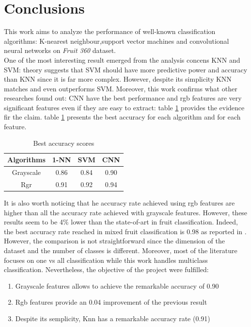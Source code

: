 \documentclass{article}
\begin{document}
\section{Conclusions}
This work aims to analyze the performance of well-known classification algorithms: K-nearest neighbour,support vector machines and convolutional neural networks on \textit{Fruit 360} dataset.\\
One of the most interesting result emerged from the analysis concens KNN and SVM: theory suggests that SVM should have more predictive power and accuracy than KNN since it is far more complex. However, despite its simplicity KNN matches and even outperforms SVM. Moreover, this work confirms what other researches found out: CNN have the best performance and rgb features are very significant features even if they are easy to extract: table \ref{results} provides the evidence fir the claim.
table \ref{results} presents the best accuracy for each algorithm and for each feature.
\begin{table}[H]
\centering
 \begin{tabular}{|c|c|c|c|} 
 \hline
  Algorithms & 1-NN & SVM & CNN\\
 \hline
 Grayscale&0.86&0.84&0.90 \\
 \hline
 Rgr&0.91& 0.92 & 0.94  \\
 \hline
\end{tabular}
\caption{Best accuracy scores} \label{results}
\end{table}
\noindent It is also worth noticing that he accuracy rate achieved using rgb features are higher than all the accuracy rate achieved with grayscale features. However, these results seem to be 4\% lower than the state-of-art in fruit classification. Indeed, the best accuracy rate reached in mixed fruit classification is 0.98 as reported in \cite{review}. However, the comparison is not straightforward since the dimension of the dataset and the number of classes is different. Moreover, most of the literature focuses on one vs all classification while this work handles multiclass classification. Nevertheless, the objective of the project were fulfilled:
\begin{enumerate}
\item Grayscale features allows to achieve the remarkable accuracy of 0.90
\item Rgb features provide an 0.04 improvement of the previous result
\item Despite its semplicity, Knn has a remarkable accuracy rate (0.91)
\end{enumerate}
\end{document}
